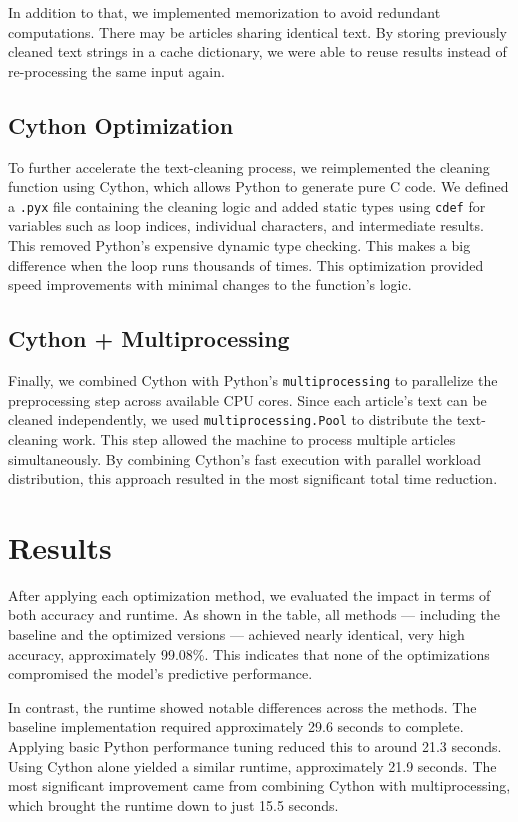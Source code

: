 \documentclass[11pt]{article}
\begin{document}
In addition to that, we implemented memorization to avoid redundant computations. There may be articles sharing identical text. By storing previously cleaned text strings in a cache dictionary, we were able to reuse results instead of re-processing the same input again.

\subsection{Cython Optimization}

To further accelerate the text-cleaning process, we reimplemented the cleaning function using Cython, which allows Python to generate pure C code. We defined a \texttt{.pyx} file containing the cleaning logic and added static types using \texttt{cdef} for variables such as loop indices, individual characters, and intermediate results. This removed Python’s expensive dynamic type checking. This makes a big difference when the loop runs thousands of times. This optimization provided speed improvements with minimal changes to the function’s logic.

\subsection{Cython + Multiprocessing}

Finally, we combined Cython with Python's \texttt{multiprocessing} to parallelize the preprocessing step across available CPU cores. Since each article's text can be cleaned independently, we used \texttt{multiprocessing.Pool} to distribute the text-cleaning work. This step allowed the machine to process multiple articles simultaneously. By combining Cython’s fast execution with parallel workload distribution, this approach resulted in the most significant total time reduction.



\section{Results}
After applying each optimization method, we evaluated the impact in terms of both accuracy and runtime. As shown in the table, all methods — including the baseline and the optimized versions — achieved nearly identical, very high accuracy, approximately 99.08\%. This indicates that none of the optimizations compromised the model’s predictive performance.

In contrast, the runtime showed notable differences across the methods. The baseline implementation required approximately 29.6 seconds to complete. Applying basic Python performance tuning reduced this to around 21.3 seconds. Using Cython alone yielded a similar runtime, approximately 21.9 seconds. The most significant improvement came from combining Cython with multiprocessing, which brought the runtime down to just 15.5 seconds.
\end{document}
